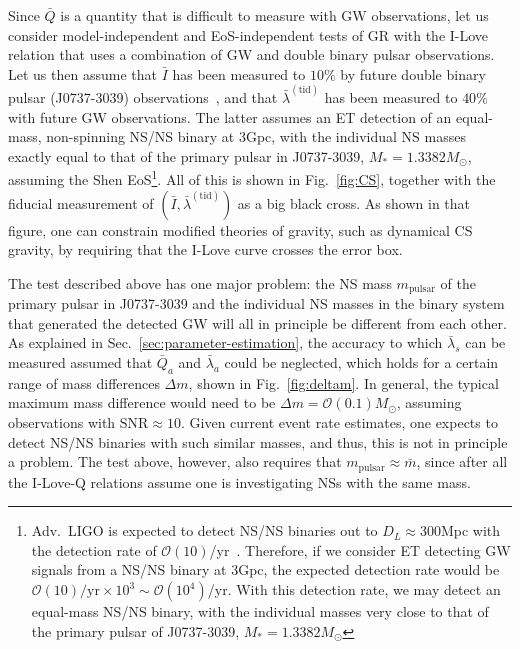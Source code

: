 \documentclass[aps,twocolumn,nofootinbib,showpacs,superscriptaddress,hyperref]{revtex4-1}
\newcommand{\NS}{*}
\newcommand{\mrm}{\mathrm}
\newcommand{\lambdabartid}{\bar{\lambda}^\mathrm{(tid)}}
\newcommand{\Ibar}{\bar{I}}
\newcommand{\Qbar}{\bar{Q}}
\begin{document}
Since $\Qbar$ is a quantity that is difficult to measure with GW observations, let us consider model-independent and EoS-independent tests of GR with the I-Love relation that uses a combination of GW and double binary pulsar observations. Let us then assume that $\Ibar$ has been measured to $10\%$ by future double binary pulsar (J0737-3039) observations~\cite{lattimer-schutz,kramer-wex}, and that $\lambdabartid$ has been measured to $40\%$ with future GW observations. The latter assumes an ET detection of an equal-mass, non-spinning NS/NS binary at 3Gpc, with the individual NS masses exactly equal to that of the primary pulsar in J0737-3039, $M_\NS=1.3382M_\odot$, assuming the Shen EoS\footnote{Adv.~LIGO is expected to detect NS/NS binaries out to $D_L \approx 300$Mpc with the detection rate of $\mathcal{O}(10)$/yr~\cite{abadie}. Therefore, if we consider ET detecting GW signals from a NS/NS binary at 3Gpc, the expected detection rate would be $\mathcal{O}(10)/\mrm{yr}\times 10^3 \sim \mathcal{O}(10^4)$/yr. With this detection rate, we may detect an equal-mass NS/NS binary, with the individual masses very close to that of the primary pulsar of J0737-3039, $M_\NS=1.3382M_\odot$}. All of this is shown in Fig.~\ref{fig:CS}, together with the fiducial measurement of $(\Ibar,\lambdabartid)$ as a big black cross. As shown in that figure, one can constrain modified theories of gravity, such as dynamical CS gravity, by requiring that the I-Love curve crosses the error box.

The test described above has one major problem: the NS mass $m_\mrm{pulsar}$ of the primary pulsar in J0737-3039 and the individual NS masses in the binary system that generated the detected GW will all in principle be different from each other. As explained in Sec.~\ref{sec:parameter-estimation}, the accuracy to which $\bar{\lambda}_{s}$ can be measured assumed that $\bar{Q}_{a}$ and $\bar{\lambda}_{a}$ could be neglected, which holds for a certain range of mass differences $\Delta m$, shown in Fig.~\ref{fig:deltam}. In general, the typical maximum mass difference would need to be $\Delta m = \mathcal{O}(0.1)M_\odot$, assuming observations with $\mrm{SNR} \approx 10$. Given current event rate estimates, one expects to detect NS/NS binaries with such similar masses, and thus, this is not in principle a problem. The test above, however, also requires that $m_\mrm{pulsar} \approx \bar{m}$, since after all the I-Love-Q relations assume one is investigating NSs with the same mass. 
\end{document}
